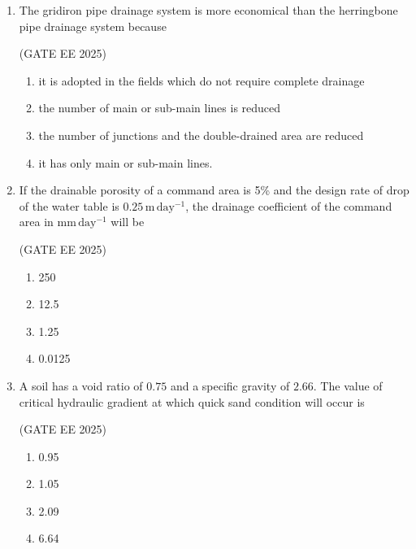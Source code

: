 \documentclass[journal,12pt,onecolumn]{IEEEtran}
\theoremstyle{remark}
\begin{document}
\begin{enumerate}
\hfill(GATE EE 2025)

\begin{multicols}{4}
\begin{enumerate}
    \item 0.015
    \item 0.025
    \item 0.055
    \item 0.150
\end{enumerate}
\end{multicols}

\item The gridiron pipe drainage system is more economical than the herringbone pipe drainage system because\

\hfill(GATE EE 2025)

\begin{enumerate}
     \item it is adopted in the fields which do not require complete drainage 
     \item the number of main or sub-main lines is reduced 
     \item the number of junctions and the double-drained area are reduced 
     \item it has only main or sub-main lines.
\end{enumerate}

\item If the drainable porosity of a command area is 5\% and the design rate of drop of the water table is $0.25\,\mathrm{m\,day^{-1}}$, the drainage coefficient of the command area in $\mathrm{mm\,day^{-1}}$ will be 

 \hfill(GATE EE 2025)
 
\begin{multicols}{4}
    \begin{enumerate}
        \item 250
        \item 12.5
        \item 1.25
        \item 0.0125
    \end{enumerate}
\end{multicols}
\vspace{3cm}
\item A soil has a void ratio of $0.75$ and a specific gravity of $2.66$. The value of critical hydraulic gradient at which quick sand condition will occur is\

\hfill(GATE EE 2025)

\begin{multicols}{4}
    \begin{enumerate}
        \item 0.95
        \item 1.05
        \item 2.09
        \item 6.64
    \end{enumerate}
\end{multicols}


\end{enumerate}
\end{document}
